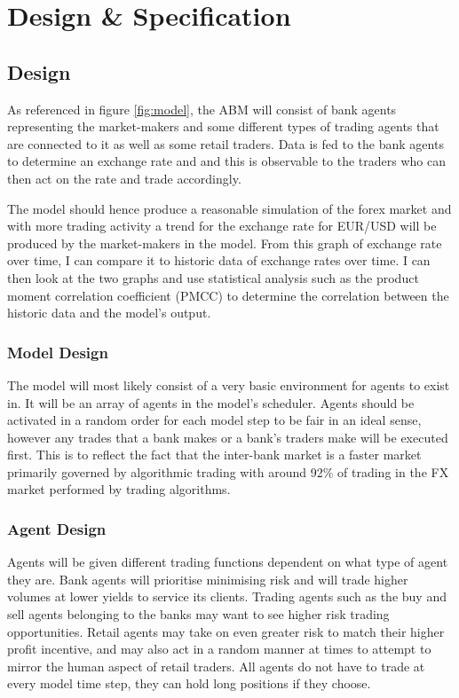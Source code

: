 \chapter{Design \& Specification}

\section{Design}

As referenced in figure \ref{fig:model}, the ABM will consist of bank agents representing the market-makers and some different types of trading agents that are connected to it as well as some retail traders. Data is fed to the bank agents to determine an exchange rate and and this is observable to the traders who can then act on the rate and trade accordingly.

The model should hence produce a reasonable simulation of the forex market and with more trading activity a trend for the exchange rate for EUR/USD will be produced by the market-makers in the model. From this graph of exchange rate over time, I can compare it to historic data of exchange rates over time. I can then look at the two graphs and use statistical analysis such as the product moment correlation coefficient (PMCC) to determine the correlation between the historic data and the model's output.

\subsection{Model Design}
The model will most likely consist of a very basic environment for agents to exist in. It will be an array of agents in the model's scheduler. Agents should be activated in a random order for each model step to be fair in an ideal sense, however any trades that a bank makes or a bank's traders make will be executed first. This is to reflect the fact that the inter-bank market is a faster market primarily governed by algorithmic trading with around 92\% of trading in the FX market performed by trading algorithms. \cite{kissell2020algorithmic}

\subsection{Agent Design}
Agents will be given different trading functions dependent on what type of agent they are. Bank agents will prioritise minimising risk and will trade higher volumes at lower yields to service its clients. Trading agents such as the buy and sell agents belonging to the banks may want to see higher risk trading opportunities. Retail agents may take on even greater risk to match their higher profit incentive, and may also act in a random manner at times to attempt to mirror the human aspect of retail traders. All agents do not have to trade at every model time step, they can hold long positions if they choose.

